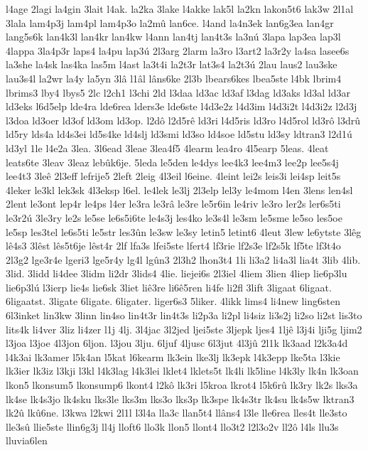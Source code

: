{l4age
2lagi
la4gin
3lait
l4ak.
la2ka
3lake
l4akke
lak5l
la2kn
lakon5t6
lak3w
2l1al
3lala
lam4p3j
lam4pl
lam4p3o
la2mû
lan6ce.
l4and
la4n3ek
lan6g3ea
lan4gr
lang5s6k
lan4k3l
lan4kr
lan4kw
l4ann
lan4tj
lan4t3s
la3nú
3lapa
lap3ea
lap3l
4lappa
3la4p3r
laps4
la4pu
lap3ú
2l3arg
2larm
la3ro
l3art2
la3r2y
la4sa
lasee6s
la3she
la4sk
las4ka
las5m
l4ast
la3t4i
la2t3r
lat3s4
la2t3ú
2lau
laus2
lau3ske
lau3s4l
la2wr
la4y
la5yn
3lâ
l1âl
lâns6ke
2l3b
lbears6kes
lbea5ste
l4bk
lbrim4
lbrims3
lby4
lbys5
2lc
l2ch1
l3chi
2ld
l3daa
ld3ac
ld3af
l3dag
ld3aks
ld3al
ld3ar
ld3eks
l6d5elp
lde4ra
lde6rea
lders3e
lde6ste
l4d3e2z
l4d3im
l4d3i2t
l4d3i2z
l2d3j
l3doa
ld3oer
ld3of
ld3om
ld3op.
l2dô
l2d5rê
ld3ri
l4d5ris
ld3ro
l4d5rol
ld3rô
l3drû
ld5ry
lds4a
ld4s3ei
ld5s4ke
ld4slj
ld3smi
ld3so
ld4soe
ld5stu
ld3sy
ldtran3
l2d1ú
ld3yl
1le
l4e2a
3lea.
3l6ead
3leae
3lea4f5
4learm
lea4ro
4l5earp
5leas.
4leat
leats6te
3leav
3leaz
lebûk6je.
5leda
le5den
le4dys
lee4k3
lee4m3
lee2p
lee5s4j
lee4t3
3leê
2l3eff
lefrije5
2left
2leig
4l3eil
l6eine.
4leint
lei2s
leis3i
lei4sp
leit5s
4leker
le3kl
lek3sk
4l3eksp
l6el.
le4lek
le3lj
2l3elp
lel3y
le4mom
l4en
3lens
len4sl
2lent
le3ont
lep4r
le4ps
l4er
le3ra
le3râ
le3re
le5r6in
le4riv
le3ro
ler2s
ler6s5ti
le3r2ú
3le3ry
le2s
le5se
le6s5i6te
le4s3j
les4ko
le3s4l
le3sm
le5sme
le5so
les5oe
le5sp
les3tel
le6s5ti
le5str
les3ûn
le3sw
le3sy
letin5
letint6
4leut
3lew
le6ytste
3lêg
lê4s3
3lêst
lês5t6je
lêst4r
2lf
lfa3s
lfei5ste
lfert4
lf3rie
lf2s3e
lf2s5k
lf5te
lf3t4o
2l3g2
lge3r4e
lgeri3
lge5r4y
lg4l
lgûn3
2l3h2
lhon3t4
1li
li3a2
li4a3l
lia4t
3lib
4lib.
3lid.
3lidd
li4dee
3lidm
li2dr
3lids4
4lie.
liejei6s
2l3iel
4liem
3lien
4liep
lie6p3lu
lie6p3lú
l3ierp
lie4s
lie6sk
3liet
liê3re
li6ê5ren
li4fe
li2fl
3lift
3ligaat
6ligaat.
6ligaatst.
3ligate
6ligate.
6ligater.
liger6s3
5liker.
4likk
lims4
li4new
ling6sten
6l3inket
lin3kw
3linn
lin4so
lin4t3r
lin4t3s
li2p3a
li2pl
li4siz
li3s2j
li2so
li2st
lis3to
lits4k
li4ver
3liz
li4zer
l1j
4lj.
3l4jac
3l2jed
ljei5ste
3ljepk
ljes4
1ljê
l3j4i
lji5g
ljim2
l3joa
l3joe
4l3jon
6ljon.
l3jou
3lju.
6ljuf
4ljusc
6l3jut
4l3jû
2l1k
lk3aad
l2k3a4d
l4k3ai
lk3amer
l5k4an
l5kat
l6kearm
lk3ein
lke3lj
lk3epk
l4k3epp
lke5ta
l3kie
lk3ier
lk3iz
l3kji
l3kl
l4k3lag
l4k3lei
lklet4
lklets5t
lk4li
lk5line
l4k3ly
lk4n
lk3oan
lkon5
lkonsum5
lkonsump6
lkont4
l2kô
lk3ri
l5kroa
lkrot4
l5k6rû
lk3ry
lk2s
lks3a
lk4se
lk4s3jo
lk4sku
lks3le
lks3m
lks3o
lks3p
lk3spe
lk4s3tr
lk4su
lk4s5w
lktran3
lk2û
lkû6ne.
l3kwa
l2kwi
2l1l
l3l4a
lla3c
llan5t4
llâns4
l3le
lle6rea
lles4t
lle3sto
lle3sû
llie5ste
llin6g3j
ll4j
lloft6
llo3k
llon5
llont4
llo3t2
l2l3o2v
ll2ô
l4ls
llu3s
lluvia6len
}
